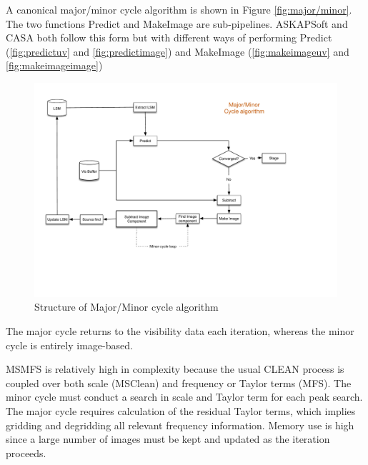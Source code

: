 \documentclass[11pt,a4paper]{article}
\begin{document}
A canonical major/minor cycle algorithm is shown in Figure \ref{fig:major/minor}. The two functions Predict and MakeImage are sub-pipelines. ASKAPSoft and CASA both follow this form but with different ways of performing Predict (\ref{fig:predictuv} and \ref{fig:predictimage}) and MakeImage (\ref{fig:makeimageuv} and \ref{fig:makeimageimage})

\begin{figure}[htb]
  \centering
  \includegraphics[width=\textwidth]{./MSMFS_MajorMinor.pdf}
  \caption{Structure of Major/Minor cycle algorithm}
  \label{fig:majorminor}
\end{figure}

The major cycle returns to the visibility data each iteration, whereas the minor cycle is entirely image-based.

MSMFS is relatively high in complexity because the usual CLEAN process is coupled over both scale (MSClean) and frequency or Taylor terms (MFS). The minor cycle must conduct a search in scale and Taylor term for each peak search. The major cycle requires calculation of the residual Taylor terms, which implies gridding and degridding all relevant frequency information. Memory use is high since a large number of images must be kept and updated as the iteration proceeds.
\end{document}
